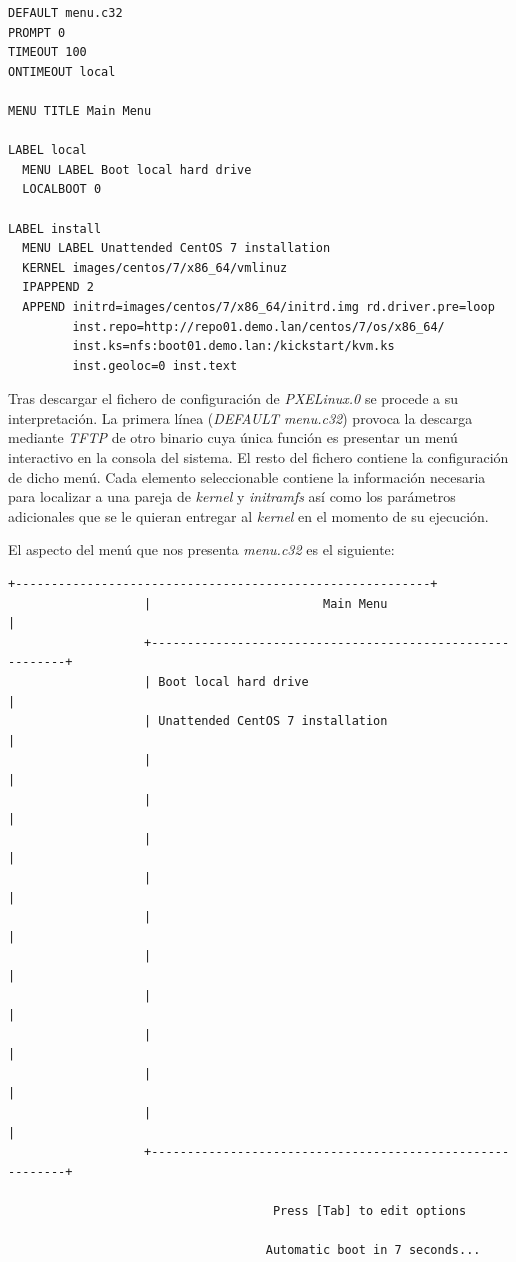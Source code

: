 \documentclass[a4paper,12pt,spanish,final]{epsc_tfc_pfc}
\begin{document}
\begin{lstlisting}[style=dnsmasq]
DEFAULT menu.c32
PROMPT 0
TIMEOUT 100
ONTIMEOUT local

MENU TITLE Main Menu

LABEL local
  MENU LABEL Boot local hard drive
  LOCALBOOT 0

LABEL install
  MENU LABEL Unattended CentOS 7 installation
  KERNEL images/centos/7/x86_64/vmlinuz
  IPAPPEND 2
  APPEND initrd=images/centos/7/x86_64/initrd.img rd.driver.pre=loop
         inst.repo=http://repo01.demo.lan/centos/7/os/x86_64/
         inst.ks=nfs:boot01.demo.lan:/kickstart/kvm.ks
         inst.geoloc=0 inst.text
\end{lstlisting}

Tras descargar el fichero de configuración de \emph{PXELinux.0} se procede a su interpretación. La primera línea (\emph{DEFAULT menu.c32}) provoca la descarga mediante \emph{TFTP} de otro binario cuya única función es presentar un menú interactivo en la consola del sistema. El resto del fichero contiene la configuración de dicho menú. Cada elemento seleccionable contiene la información necesaria para localizar a una pareja de \emph{kernel} y \emph{initramfs} así como los parámetros adicionales que se le quieran entregar al \emph{kernel} en el momento de su ejecución.

El aspecto del menú que nos presenta \emph{menu.c32} es el siguiente:\\

\begin{lstlisting}[style=dnsmasq]
                   +----------------------------------------------------------+
                   |                        Main Menu                         |
                   +----------------------------------------------------------+
                   | Boot local hard drive                                    |
                   | Unattended CentOS 7 installation                         |
                   |                                                          |
                   |                                                          |
                   |                                                          |
                   |                                                          |
                   |                                                          |
                   |                                                          |
                   |                                                          |
                   |                                                          |
                   |                                                          |
                   |                                                          |
                   +----------------------------------------------------------+

                                     Press [Tab] to edit options

                                    Automatic boot in 7 seconds...
\end{lstlisting}
\end{document}

